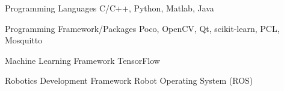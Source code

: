 


\begin{cvskills}


\cvskill
{Programming Languages } %
{C/C++, Python, Matlab, Java} %


\cvskill
{Programming Framework/Packages}
{Poco, OpenCV, Qt, scikit-learn, PCL, Mosquitto}


\cvskill
{Machine Learning Framework} %
{TensorFlow} %





\cvskill
{Robotics Development Framework}
{Robot Operating System (ROS)}


\end{cvskills}